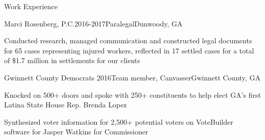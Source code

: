\documentclass{resume} %
\begin{document}
\begin{rSection}{Work Experience}

\begin{rSubsection}{Marci Rosenberg, P.C.}{2016-2017}{Paralegal}{Dunwoody, GA}
\item Conducted research, managed communication and constructed legal documents for 65 cases representing injured workers, reflected in 17 settled cases for a total of \$1.7 million in settlements for our clients
\end{rSubsection}

\begin{rSubsection}{Gwinnett County Democrats }{2016}{Team member, Canvasser}{Gwinnett County, GA}
\item Knocked on 500+ doors and spoke with 250+ constituents to help elect GA’s first Latina State House Rep. Brenda Lopez
\item Synthesized voter information for 2,500+ potential voters on VoteBuilder software for Jasper Watkins for Commissioner
\end{rSubsection}
\end{rSection}

\end{document}
